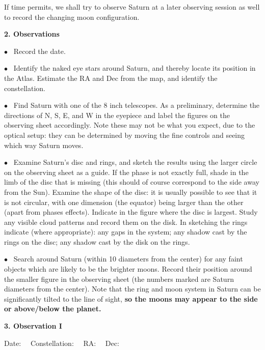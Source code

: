\documentclass[12pt]{article}
\begin{document}
If time permits, we shall try to observe Saturn at a later observing
session as well to record the changing moon configuration.

\bigskip
\noindent
{\bf 2. Observations}

\medskip
\noindent

\noindent $\bullet$ \ 
Record the date.

\medskip
\noindent $\bullet$ \ 
 Identify the naked eye stars around Saturn, and thereby locate its 
position in the Atlas. Estimate the RA and Dec from the map,
and identify the constellation.

\medskip
\noindent $\bullet$ \  
 Find Saturn  with one of the 8 inch telescopes.
As a preliminary, determine the directions of N, S, E, and W
in the eyepiece and label the figures on the observing sheet
accordingly. Note these may not be what you expect, due to the
optical setup: they can be determined by moving the fine controls and
seeing which way Saturn moves.

\medskip
\noindent $\bullet$ \ 
Examine Saturn's disc and rings, and sketch the results using the
larger circle on the observing sheet as a guide. If the phase is not exactly
full, shade in the limb of the disc that is missing (this should of
course correspond to the side away from the Sun).  Examine the
shape of the disc: it is usually possible to see that it is not
circular, with one dimension (the equator) being larger than the other
(apart from phases effects). Indicate in the figure where the disc is
largest.  Study any visible cloud patterns and record them on the
disk.  In sketching the rings indicate (where appropriate): any gaps
in the system; any shadow cast by the rings on the disc; any
shadow cast by the disk on the rings.

\medskip
\noindent $\bullet$ \ 
Search around Saturn (within 10 diameters from the center) for any
faint objects which are likely to be the brighter moons. Record their
position around the smaller figure in the observing sheet (the numbers
marked are Saturn diameters from the center). Note that the ring and
moon system in Saturn can be significantly tilted to the line of sight,
{\bf so the moons may appear to the side or above/below the planet.}



\newpage
\noindent
{\bf 3. Observation I}
\bigskip\bigskip
\noindent

Date: \makebox[2cm]{\hrulefill} \ \ 
Constellation: \makebox[2cm]{\hrulefill} \ \ 
RA: \makebox[2cm]{\hrulefill} \ \ 
Dec: \makebox[2cm]{\hrulefill} \ \ 
\end{document}

